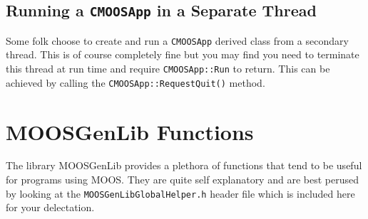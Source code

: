 \documentclass[a4paper,10pt]{article}
\newcommand{\Code}[1]{\texttt{#1} }
\newcommand{\code}[1]{\Code{#1} }
\begin{document}
\subsection{Running a \code{CMOOSApp} in a Separate Thread}

Some folk choose to create and run a \code{CMOOSApp} derived class from a secondary thread. This is of course completely fine but you may find you need to terminate this thread at run time and require \code{CMOOSApp::Run} to return. This can be achieved by calling the \code{CMOOSApp::RequestQuit()} method.


\section{MOOSGenLib Functions}\label{Sec:MOOSGenLib}

The library MOOSGenLib provides a plethora of functions that tend
to be useful for programs using MOOS. They are quite self
explanatory and are best perused by looking at the
\code{MOOSGenLibGlobalHelper.h} header file which is included here
for your delectation. 
\end{document}
